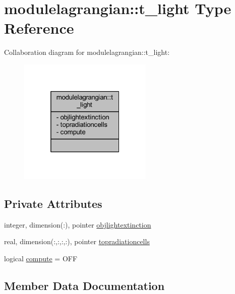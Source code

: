 \hypertarget{structmodulelagrangian_1_1t__light}{}\section{modulelagrangian\+:\+:t\+\_\+light Type Reference}
\label{structmodulelagrangian_1_1t__light}


Collaboration diagram for modulelagrangian\+:\+:t\+\_\+light\+:\nopagebreak
\begin{figure}[H]
\begin{center}
\leavevmode
\includegraphics[width=181pt]{structmodulelagrangian_1_1t__light__coll__graph}
\end{center}
\end{figure}
\subsection*{Private Attributes}
\begin{DoxyCompactItemize}
\item 
integer, dimension(\+:), pointer \mbox{\hyperlink{structmodulelagrangian_1_1t__light_ae9db5923c4cc4c9edd02c42c14ccc78d}{objlightextinction}}
\item 
real, dimension(\+:,\+:,\+:,\+:), pointer \mbox{\hyperlink{structmodulelagrangian_1_1t__light_a114df72540e411ee85fa831276a7a35b}{topradiationcells}}
\item 
logical \mbox{\hyperlink{structmodulelagrangian_1_1t__light_ade7871378d45447182ad6d4fc8477e0c}{compute}} = O\+FF
\end{DoxyCompactItemize}


\subsection{Member Data Documentation}
\mbox{\label{structmodulelagrangian_1_1t__light_ade7871378d45447182ad6d4fc8477e0c}} 

